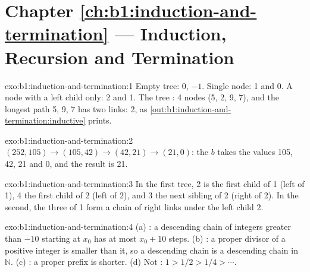 \section*{Chapter \ref{ch:b1:induction-and-termination} --- Induction, Recursion and Termination}

\begin{solution}{exo:b1:induction-and-termination:1}
Empty tree:  0,  $-1$. Single node: 1 and 0. A node with a left child only: 2 and 1. The tree : 4 nodes
(5, 2, 9, 7), and the longest path 5, 9, 7 has two links:  2, as \cref{out:b1:induction-and-termination:inductive}
prints.
\end{solution}

\begin{solution}{exo:b1:induction-and-termination:2}
$(252, 105) \to (105, 42) \to (42, 21) \to (21, 0)$: the  $b$ takes the values 105, 42, 21 and 0, and the
result is 21.
\end{solution}

\begin{solution}{exo:b1:induction-and-termination:3}
In the first tree, 2 is the first child of 1 (left of 1), 4 the first child of 2 (left of 2), and 3 the next sibling of
2 (right of 2). In the second, the three  of 1 form a chain of right links under the left child 2.
\end{solution}

\begin{solution}{exo:b1:induction-and-termination:4}
(a) : a descending chain of integers greater than $-10$ starting at $x_0$ has at most $x_0 + 10$ steps.
(b) : a proper divisor of a positive integer is smaller than it, so a descending chain is a descending chain
in $\mathbb{N}$. (c) : a proper prefix is shorter. (d) Not : $1 > 1/2 > 1/4 > \cdots$.
\end{solution}

